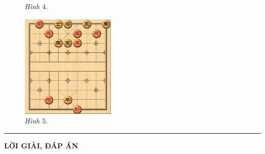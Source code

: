\begin{multicols}{2}
\begin{figure}[H]
		\caption{\small\textit{\color{gocco}Hình $4$.}}
		\vspace*{-10pt}
	\end{figure}
	\begin{figure}[H]
		\vspace*{5pt}
		\centering
		\captionsetup{labelformat= empty, justification=centering}
		\includegraphics[width= 0.4\textwidth]{5}
		\caption{\small\textit{\color{gocco}Hình $5$.}}
		\vspace*{-10pt}
	\end{figure}
\end{multicols}
\vspace*{-10pt}
{\color{gocco}\rule{1\linewidth}{0.1pt}}
\vskip 0.2cm
{\centerline{\LARGE\textbf{\color{gocco}LỜI GIẢI, ĐÁP ÁN}}}
